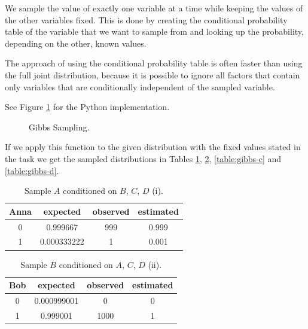 \documentclass{support/acm_proc_article-sp}
\begin{document}
    We sample the value of exactly one variable at a time while keeping the values of the other variables fixed.
    This is done by creating the conditional probability table of the variable that we want to sample from and looking
    up the probability, depending on the other, known values. \cite[p.838]{Murphy:2012:MLP:2380985}

    The approach of using the conditional probability table is often faster than using the full joint distribution,
    because it is possible to ignore all factors that contain only variables that are conditionally independent of the
    sampled variable. \cite[p.494f.]{Russell:2003:AIM:773294}

    See Figure \ref{fig:gibbs} for the Python implementation.
    \begin{figure}[!htbp]
        \centering
        \lstset{numbers=none,xleftmargin=0em}
        
        \caption{Gibbs Sampling.}
        \label{fig:gibbs}
    \end{figure}

    If we apply this function to the given distribution with the fixed values stated in the task we get the sampled
    distributions in Tables \ref{table:gibbs-a}, \ref{table:gibbs-b}, \ref{table:gibbs-c} and \ref{table:gibbs-d}.

    \begin{table}[!htbp]
        \begin{center}
            \begin{tabular}{ c c c c }
                Anna & expected & observed & estimated \\
                \hline
                0 & 0.999667 & 999 & 0.999 \\
                1 & 0.000333222 & 1 & 0.001 \\
            \end{tabular}
        \end{center}
        \caption{Sample $A$ conditioned on $B$, $C$, $D$ (i).}
        \label{table:gibbs-a}
    \end{table}

    \begin{table}[!htbp]
        \begin{center}
            \begin{tabular}{ c c c c }
                Bob & expected & observed & estimated \\
                \hline
                0 & 0.000999001 & 0 & 0 \\
                1 & 0.999001 & 1000 & 1 \\
            \end{tabular}
        \end{center}
        \caption{Sample $B$ conditioned on $A$, $C$, $D$ (ii).}
        \label{table:gibbs-b}
    \end{table}
\end{document}
